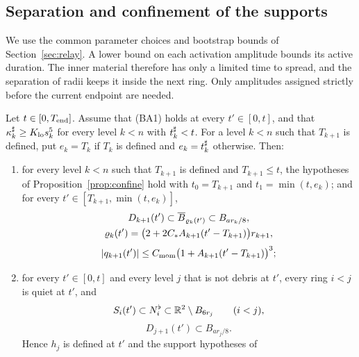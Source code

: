 \subsection{Separation and confinement of the supports}
\label{sec:bootstrap-geometry}

We use the common parameter choices and bootstrap bounds of
Section~\ref{sec:relay}. A lower bound on each activation amplitude bounds
its active duration. The inner material therefore has only a limited time
to spread, and the separation of radii keeps it inside the next ring.
Only amplitudes assigned strictly before the current endpoint are needed.

\begin{lemma}
\label{lem:geometry}
Let $t\in[0,T_{\mathrm{end}}]$. Assume that \textup{(BA1)} holds at every $t'\in[0,t]$, and
that $\kappa^\sharp_k\ge K_{\mathrm{lo}} s_k^5$ for every level $k<n$ with $t^\sharp_k<t$. For a level
$k<n$ such that $T_{k+1}$ is defined, put $e_k=T_k$ if $T_k$ is defined and
$e_k=t^\sharp_k$ otherwise. Then:
\begin{enumerate}[label=\textup{(\alph*)}]
\item for every level $k<n$ such that $T_{k+1}$ is defined and $T_{k+1}\le t$, the
  hypotheses of Proposition~\ref{prop:confine} hold with $t_0=T_{k+1}$ and
  $t_1=\min(t,e_k)$; and for every $t'\in[T_{k+1},\min(t,e_k)]$,
  \begin{equation}
  \label{eq:geometry-confinement}
  \begin{gathered}
  D_{k+1}(t')\subset\overline B_{\varrho_k(t')}\subset B_{ar_k/8},\\
  \varrho_k(t')=\big(2+2C_{*} A_{k+1}(t'-T_{k+1})\big)r_{k+1},
  \end{gathered}
  \end{equation}
  \begin{equation}
  \label{eq:geometry-moment}
  |q_{k+1}(t')|\le C_{\mathrm{mom}}\big(1+A_{k+1}(t'-T_{k+1})\big)^3;
  \end{equation}
\item for every $t'\in[0,t]$ and every level $j$ that is not debris at $t'$, every
  ring $i<j$ is quiet at $t'$, and
  \begin{equation}
  \label{eq:geometry-quiet-support}
  S_i(t')\subset N^{\flat}_i\subset\mathbb{R}^2\setminus B_{6r_j}\qquad(i<j),
  \end{equation}
  \begin{equation}
  \label{eq:geometry-quiet-inner}
  D_{j+1}(t')\subset B_{ar_j/8}.
  \end{equation}
  Hence $h_j$ is defined at $t'$ and the support hypotheses of

\end{enumerate}
\end{lemma}
